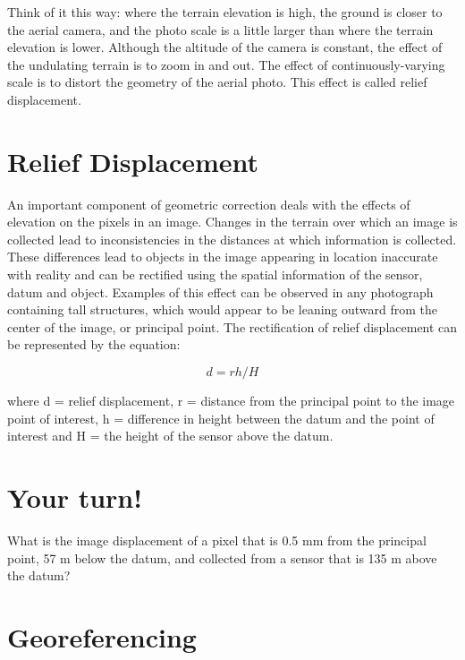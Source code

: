 \documentclass[
]{book}
\begin{document}
Think of it this way: where the terrain elevation is high, the ground is
closer to the aerial camera, and the photo scale is a little larger than
where the terrain elevation is lower. Although the altitude of the
camera is constant, the effect of the undulating terrain is to zoom in
and out. The effect of continuously-varying scale is to distort the
geometry of the aerial photo. This effect is called relief displacement.

\hypertarget{relief-displacement}{%
\section{Relief Displacement}\label{relief-displacement}}

An important component of geometric correction deals with the effects of
elevation on the pixels in an image. Changes in the terrain over which
an image is collected lead to inconsistencies in the distances at which
information is collected. These differences lead to objects in the image
appearing in location inaccurate with reality and can be rectified using
the spatial information of the sensor, datum and object. Examples of
this effect can be observed in any photograph containing tall
structures, which would appear to be leaning outward from the center of
the image, or principal point. The rectification of relief displacement
can be represented by the equation:

\begin{equation}
d = rh/H
\label{eq:ortho}
\end{equation}

where d = relief displacement, r = distance from the principal point to
the image point of interest, h = difference in height between the datum
and the point of interest and H = the height of the sensor above the
datum.

\hypertarget{your-turn-8}{%
\section*{Your turn!}\label{your-turn-8}}

What is the image displacement of a pixel that is 0.5 mm from the
principal point, 57 m below the datum, and collected from a sensor that
is 135 m above the datum?

\hypertarget{georeferencing}{%
\section{Georeferencing}\label{georeferencing}}
\end{document}
